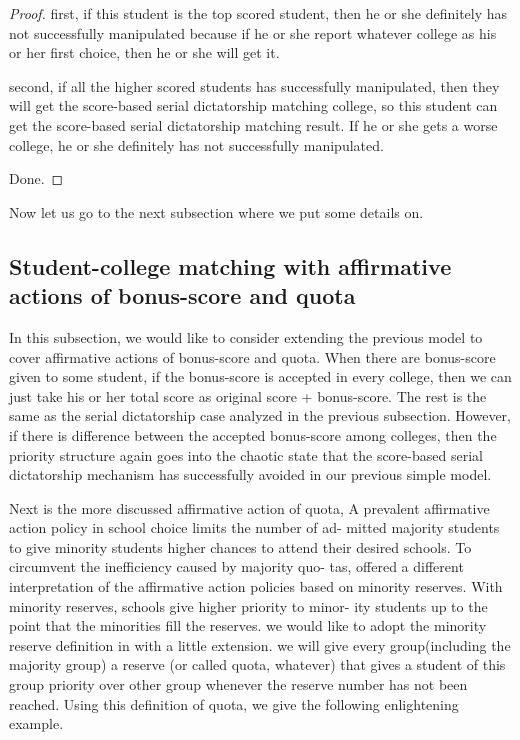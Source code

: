 \begin{proof}
first, if this student is the top scored student, then he or she definitely has not successfully manipulated because if he or she report whatever college as his or her first choice, then he or she will get it.

second, if all the higher scored students has successfully manipulated, then they will get the score-based serial dictatorship matching college, so this student can get the score-based serial dictatorship matching result. If he or she gets a worse college, he or she definitely has not successfully manipulated.
 
Done.
\end{proof}

Now let us go to the next subsection where we put some details on.

\subsection{Student-college matching with affirmative actions of bonus-score
  and quota}

In this subsection, we would like to consider extending the previous
model to cover affirmative actions of bonus-score and quota.
When there are bonus-score given to some student, if the bonus-score
is accepted in every college, then we can just take his or her total score as
original score + bonus-score. The rest is the same as the serial
dictatorship case analyzed in the previous subsection. However, if
there is difference between the accepted bonus-score
among colleges, then the priority structure again goes into the
chaotic state that the score-based serial dictatorship mechanism has
successfully avoided in our previous simple model.

Next is the more discussed affirmative action of quota, 
A prevalent affirmative action policy in school choice limits the number of ad-
mitted majority students to give minority students higher chances to attend their
desired schools. To circumvent the inefficiency caused by majority quo-
tas, \parencite{Hafalir2013} offered a different interpretation of the affirmative action policies based on
minority reserves. With minority reserves, schools give higher priority to minor-
ity students up to the point that the minorities fill the reserves.
we would like to adopt the minority reserve definition
in \parencite{Hafalir2013} with a little extension. we will give every group(including the majority group) a reserve (or
called quota, whatever) that gives a student of this group priority
over other group whenever the reserve number has not been reached.
Using this definition of quota, we give the following enlightening
example.

